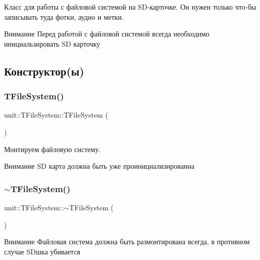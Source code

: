 Класс для работы с файловой системой на S\+D-\/карточке. Он нужен только что-\/бы записывать туда фотки, аудио и метки. \begin{DoxyAttention}{Внимание}
Перед работой с файловой системой всегда необходимо инициальзировать SD карточку 
\end{DoxyAttention}


\subsection{Конструктор(ы)}
\mbox{\label{classunit_1_1_t_file_system_ac45162c4d69b6661aab204724af57322}} 
\subsubsection{\texorpdfstring{T\+File\+System()}{TFileSystem()}}
{\footnotesize\ttfamily unit\+::\+T\+File\+System\+::\+T\+File\+System (\begin{DoxyParamCaption}{ }\end{DoxyParamCaption})}

Монтируем файловую систему. \begin{DoxyAttention}{Внимание}
SD карта должна быть уже проинициализированна 
\end{DoxyAttention}
\mbox{\label{classunit_1_1_t_file_system_a87299dbbdea872b06972f1432ef9ef88}} 
\subsubsection{\texorpdfstring{$\sim$\+T\+File\+System()}{~TFileSystem()}}
{\footnotesize\ttfamily unit\+::\+T\+File\+System\+::$\sim$\+T\+File\+System (\begin{DoxyParamCaption}{ }\end{DoxyParamCaption})}

\begin{DoxyAttention}{Внимание}
Файловая система должна быть размонтирована всегда, в противном случае SD\textquotesingle{}шка убивается 
\end{DoxyAttention}


